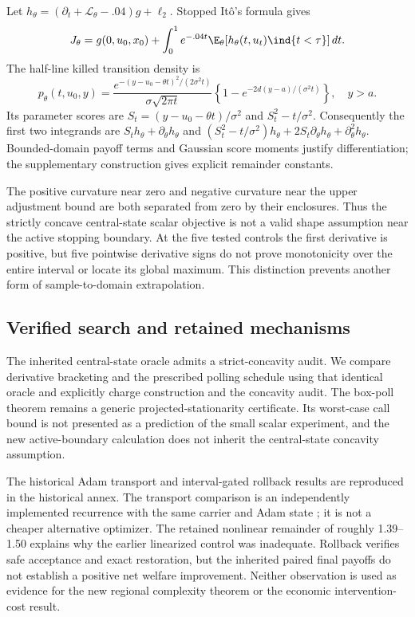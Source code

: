 Let $h_\theta=(\partial_t+\mathcal L_\theta-.04)g+\ell_2$. Stopped It\^o's formula gives
\begin{equation}\label{eq:dynkin30}
 J_\theta=g(0,u_0,x_0)+\int_0^1e^{-.04t}\E_\theta[h_\theta(t,u_t)\ind\{t<\tau\}]\,dt.
\end{equation}
The half-line killed transition density is
\begin{equation}\label{eq:kernel30}
 p_\theta(t,u_0,y)=\frac{e^{-(y-u_0-\theta t)^2/(2\sigma^2t)}}{\sigma\sqrt{2\pi t}}
 \left\{1-e^{-2d(y-a)/(\sigma^2t)}\right\},\quad y>a.
\end{equation}
Its parameter scores are $S_t=(y-u_0-\theta t)/\sigma^2$ and $S_t^2-t/\sigma^2$. Consequently the first two integrands are $S_th_\theta+\partial_\theta h_\theta$ and $(S_t^2-t/\sigma^2)h_\theta+2S_t\partial_\theta h_\theta+\partial_\theta^2h_\theta$. Bounded-domain payoff terms and Gaussian score moments justify differentiation; the supplementary construction gives explicit remainder constants.



The positive curvature near zero and negative curvature near the upper adjustment bound are both separated from zero by their enclosures. Thus the strictly concave central-state scalar objective is not a valid shape assumption near the active stopping boundary. At the five tested controls the first derivative is positive, but five pointwise derivative signs do not prove monotonicity over the entire interval or locate its global maximum. This distinction prevents another form of sample-to-domain extrapolation.

\subsection{Verified search and retained mechanisms}

The inherited central-state oracle admits a strict-concavity audit. We compare derivative bracketing and the prescribed polling schedule using that identical oracle and explicitly charge construction and the concavity audit. The box-poll theorem remains a generic projected-stationarity certificate. Its worst-case call bound is not presented as a prediction of the small scalar experiment, and the new active-boundary calculation does not inherit the central-state concavity assumption.

The historical Adam transport and interval-gated rollback results are reproduced in the historical annex. The transport comparison is an independently implemented recurrence with the same carrier and Adam state \citep{KingmaBa2015}; it is not a cheaper alternative optimizer. The retained nonlinear remainder of roughly 1.39--1.50 explains why the earlier linearized control was inadequate. Rollback verifies safe acceptance and exact restoration, but the inherited paired final payoffs do not establish a positive net welfare improvement. Neither observation is used as evidence for the new regional complexity theorem or the economic intervention-cost result.

